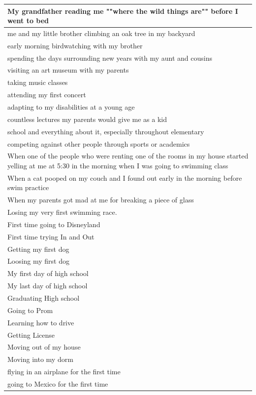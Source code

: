 \documentclass[
  .7em,
  letterpaper,
  DIV=11,
  numbers=noendperiod]{scrartcl}
\begin{document}
\begin{table}
\begin{tabular}{l}
\hline
My grandfather reading me ""where the wild things are"" before I went to bed\\
\hline
me and my little brother climbing an oak tree in my backyard\\
\hline
early morning birdwatching with my brother\\
\hline
spending the days surrounding new years with my aunt and cousins\\
\hline
visiting an art museum with my parents\\
\hline
taking music classes\\
\hline
attending my first concert\\
\hline
adapting to my disabilities at a young age\\
\hline
countless lectures my parents would give me as a kid\\
\hline
school and everything about it, especially throughout elementary\\
\hline
competing against other people through sports or academics\\
\hline
When one of the people who were renting one of the rooms in my house started yelling at me at 5:30 in the morning when I was going to swimming class\\
\hline
When a cat pooped on my couch and I found out early in the morning before swim practice\\
\hline
When my parents got mad at me for breaking a piece of glass\\
\hline
Losing my very first swimming race.\\
\hline
First time going to Disneyland\\
\hline
First time trying In and Out\\
\hline
Getting my first dog\\
\hline
Loosing my first dog\\
\hline
My first day of high school\\
\hline
My last day of high school\\
\hline
Graduating High school\\
\hline
Going to Prom\\
\hline
Learning how to drive\\
\hline
Getting License\\
\hline
Moving out of my house\\
\hline
Moving into my dorm\\
\hline
flying in an airplane for the first time\\
\hline
going to Mexico for the first time\\

\end{tabular}
\end{table}
\end{document}
